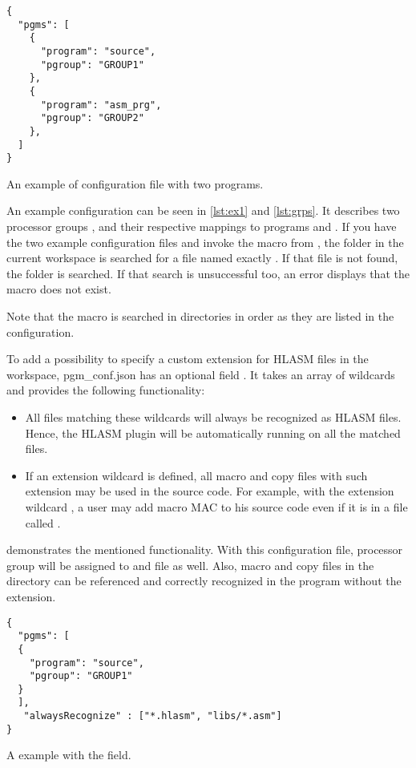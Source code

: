 \begin{listing}
	\begin{verbatim}
{
  "pgms": [
    {
      "program": "source",
      "pgroup": "GROUP1"
    },
    {
      "program": "asm_prg",
      "pgroup": "GROUP2"
    },
  ]
}
	\end{verbatim}
	\caption{An example of  configuration file with two programs.}
	\label{lst:grps}
\end{listing}

An example configuration can be seen in \cref{lst:ex1} and \cref{lst:grps}. It describes two processor groups ,  and their respective mappings to programs  and . If you have the two example configuration files and invoke the  macro from , the folder  in the current workspace is searched for a file named exactly . If that file is not found, the folder  is searched. If that search is unsuccessful too, an error displays that the macro does not exist.

Note that the macro  is searched in directories in order as they are listed in the configuration. 

To add a possibility to specify a custom extension for HLASM files in the workspace, {pgm\_conf.json} has an optional field . It takes an array of wildcards and provides the following functionality:
\begin{itemize}
	\item All files matching these wildcards will always be recognized as HLASM files. Hence, the HLASM plugin will be automatically running on all the matched files.
	\item If an extension wildcard is defined, all macro and copy files with such extension may be used in the source code. For example, with the extension wildcard , a user may add macro MAC to his source code even if it is in a file called .
\end{itemize}

 demonstrates the mentioned functionality. With this configuration file, processor group  will be assigned to  and  file as well. Also, macro and copy files in the  directory can be referenced and correctly recognized in the program without the  extension.


\begin{listing}
	\begin{verbatim}
{
  "pgms": [
  {
    "program": "source",
    "pgroup": "GROUP1"
  }
  ],
   "alwaysRecognize" : ["*.hlasm", "libs/*.asm"]
}
	\end{verbatim}
	\caption{A  example with the  field.}
	\label{lst:alw}
\end{listing}

